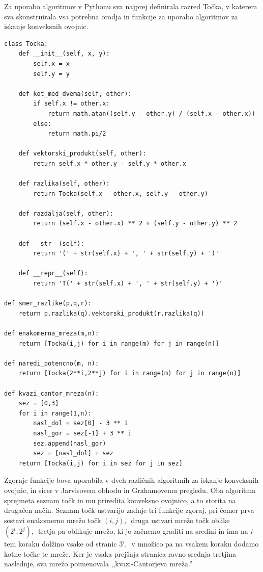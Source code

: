 \documentclass[a4paper]{article}
\begin{document}
Za uporabo algoritmov v Pythonu sva najprej definirala razred Točka, v katerem sva skonstruirala vsa potrebna orodja in funkcije za uporabo algoritmov za iskanje konveksnih ovojnic.

\begin{lstlisting}
class Tocka:
    def __init__(self, x, y):
        self.x = x
        self.y = y

    def kot_med_dvema(self, other):
        if self.x != other.x:
            return math.atan((self.y - other.y) / (self.x - other.x))
        else:
            return math.pi/2

    def vektorski_produkt(self, other): 
        return self.x * other.y - self.y * other.x

    def razlika(self, other):
    	return Tocka(self.x - other.x, self.y - other.y)

    def razdalja(self, other):
        return (self.x - other.x) ** 2 + (self.y - other.y) ** 2

    def __str__(self):
        return '(' + str(self.x) + ', ' + str(self.y) + ')'

    def __repr__(self):
        return 'T(' + str(self.x) + ', ' + str(self.y) + ')'

def smer_razlike(p,q,r):
    return p.razlika(q).vektorski_produkt(r.razlika(q))

def enakomerna_mreza(m,n):
    return [Tocka(i,j) for i in range(m) for j in range(n)]

def naredi_potencno(m, n):
    return [Tocka(2**i,2**j) for i in range(m) for j in range(n)]

def kvazi_cantor_mreza(n):
    sez = [0,3]
    for i in range(1,n):
        nasl_dol = sez[0] - 3 ** i
        nasl_gor = sez[-1] + 3 ** i
        sez.append(nasl_gor)
        sez = [nasl_dol] + sez
    return [Tocka(i,j) for i in sez for j in sez]
\end{lstlisting}

Zgornje funkcije bova uporabila v dveh različnih algoritmih za iskanje konveksnih ovojnic, in sicer v Jarvisovem obhodu in Grahamovemu pregledu.
Oba algoritma sprejmeta seznam točk in mu priredita konveksno ovojnico, a to storita na drugačen način.
Seznam točk ustvarijo zadnje tri funkcije zgoraj, pri čemer prva sestavi enakomerno mrežo točk $(i, j),$~druga ustvari mrežo točk oblike $(2^i, 2^j),$~tretja pa oblikuje mrežo, ki
jo začnemo graditi na sredini in ima na $i$-tem koraku dolžino vsake od stranic $3^i,$~v množico pa na vsakem koraku dodamo kotne točke te mreže. Ker je vsaka prejšnja stranica
ravno srednja tretjina naslednje, sva mrežo poimenovala ,,kvazi-Cantorjeva mreža.''
\end{document}
